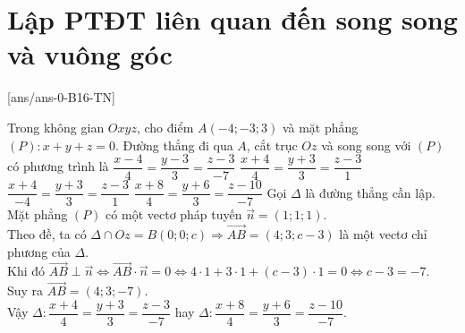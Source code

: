 \section{Lập PTĐT liên quan đến song song và vuông góc}
\TN
{}[ans/ans-0-B16-TN]
\setcounter{ex}{0}
\begin{ex}%
	Trong không gian $Oxyz$, cho điểm $A(-4;-3;3)$ và mặt phẳng $(P)\colon x+y+z=0$. Đường thẳng đi qua $A$, cắt trục $Oz$ và song song với $(P)$ có phương trình là
	\choice
	{$\dfrac{x-4}{4}=\dfrac{y-3}{3}=\dfrac{z-3}{-7}$}
	{$\dfrac{x+4}{4}=\dfrac{y+3}{3}=\dfrac{z-3}{1}$}
	{$\dfrac{x+4}{-4}=\dfrac{y+3}{3}=\dfrac{z-3}{1}$}
	{\True $\dfrac{x+8}{4}=\dfrac{y+6}{3}=\dfrac{z-10}{-7}$}
	\loigiai
	{
		Gọi $\Delta$ là đường thẳng cần lập.\\
		Mặt phẳng $(P)$ có một vectơ pháp tuyến $\vec{n}=(1;1;1)$.\\
		Theo đề, ta có $\Delta\cap Oz=B(0;0;c) \Rightarrow \overrightarrow{AB}=(4;3;c-3)$ là một vectơ chỉ phương của $\Delta$.\\
		Khi đó $\overrightarrow{AB}\perp\vec{n}\Leftrightarrow\overrightarrow{AB}\cdot\vec{n}=0\Leftrightarrow4\cdot1+3\cdot1+(c-3)\cdot1=0\Leftrightarrow c-3=-7$.\\
		Suy ra $\overrightarrow{AB}=(4;3;-7)$.\\
		Vậy $\Delta\colon \dfrac{x+4}{4}=\dfrac{y+3}{3}=\dfrac{z-3}{-7}$ hay $\Delta\colon \dfrac{x+8}{4}=\dfrac{y+6}{3}=\dfrac{z-10}{-7}$.
	}
\end{ex}

